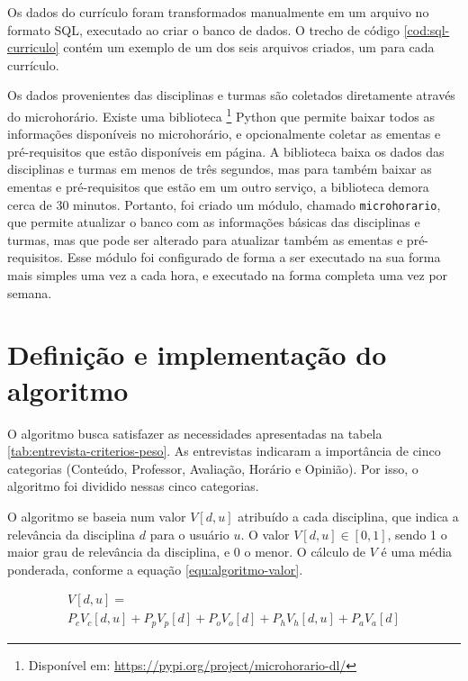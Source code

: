 Os dados do currículo foram transformados manualmente em um arquivo no formato SQL, executado ao criar o banco de dados. O trecho de código \ref{cod:sql-curriculo} contém um exemplo de um dos seis arquivos criados, um para cada currículo.



Os dados provenientes das disciplinas e turmas são coletados diretamente através do microhorário. Existe uma biblioteca  
\footnote{Dispon\'ivel em: \url{https://pypi.org/project/microhorario-dl/}}
Python que permite baixar todos as informações disponíveis no microhorário, e opcionalmente coletar as ementas e pré-requisitos que estão disponíveis em página. A biblioteca baixa os dados das disciplinas e turmas em menos de três segundos, mas para também baixar as ementas e pré-requisitos que estão em um outro serviço, a biblioteca demora cerca de 30 minutos. Portanto, foi criado um módulo, chamado \verb|microhorario|, que permite atualizar o banco com as informações básicas das disciplinas e turmas, mas que pode ser alterado para atualizar também as ementas e pré-requisitos. Esse módulo foi configurado de forma a ser executado na sua forma mais simples uma vez a cada hora, e executado na forma completa uma vez por semana.

\section{Definição e implementação do algoritmo}

O algoritmo busca satisfazer as necessidades apresentadas na tabela \ref{tab:entrevista-criterios-peso}. As entrevistas indicaram a importância de cinco categorias (Conteúdo, Professor, Avaliação, Horário e Opinião). Por isso, o algoritmo foi dividido nessas cinco categorias.

O algoritmo se baseia num valor $V[d,u]$ atribuído a cada disciplina, que indica a relevância da disciplina $d$ para o usuário $u$. O valor $V[d,u] \in [0, 1]$,
sendo 1 o maior grau de relevância da disciplina, e 0 o menor. O cálculo de $V$ é uma média ponderada, conforme a equação \ref{equ:algoritmo-valor}.

\begin{multline}
\label{equ:algoritmo-valor}
    V[d,u] = \\
        P_cV_c[d,u] + P_pV_p[d] + P_oV_o[d] + P_hV_h[d,u] + P_aV_a[d]
\end{multline}

